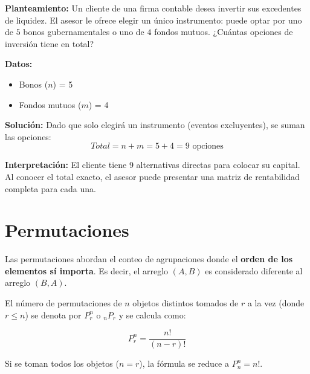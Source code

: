\documentclass[12pt,letterpaper]{book}
\newcounter{ejemplo}[chapter]
\begin{document}
\begin{ejemplo}
    \textbf{Planteamiento:} Un cliente de una firma contable desea invertir sus excedentes de liquidez. El asesor le ofrece elegir un único instrumento: puede optar por uno de $5$ bonos gubernamentales o uno de $4$ fondos mutuos. ¿Cuántas opciones de inversión tiene en total?
    
    \textbf{Datos:}
    \begin{itemize}
        \item Bonos ($n$) = 5
        \item Fondos mutuos ($m$) = 4
    \end{itemize}
    
    \textbf{Solución:}
    Dado que solo elegirá un instrumento (eventos excluyentes), se suman las opciones:
    \[ Total = n + m = 5 + 4 = 9 \text{ opciones} \]
    
    \textbf{Interpretación:} El cliente tiene 9 alternativas directas para colocar su capital. Al conocer el total exacto, el asesor puede presentar una matriz de rentabilidad completa para cada una.
\end{ejemplo}

\section{Permutaciones}

Las permutaciones abordan el conteo de agrupaciones donde el \textbf{orden de los elementos sí importa}. Es decir, el arreglo $(A, B)$ es considerado diferente al arreglo $(B, A)$.

\begin{definicion}
    El número de permutaciones de $n$ objetos distintos tomados de $r$ a la vez (donde $r \leq n$) se denota por $P_{r}^{n}$ o $_{n}P_{r}$ y se calcula como:
    \begin{formulaclave}
        \[ P_{r}^{n} = \frac{n!}{(n-r)!} \]
    \end{formulaclave}
    Si se toman todos los objetos ($n=r$), la fórmula se reduce a $P_{n}^{n} = n!$.
\end{definicion}
\end{document}
